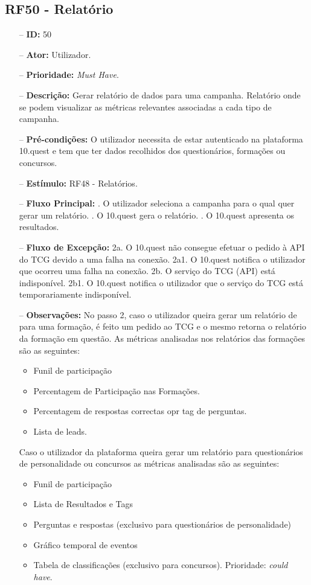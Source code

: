 \subsection{RF50 - Relatório}
\begin{itemize}
	\item[--] \textbf{ID:} 50
	\item[--]  \textbf{Ator:} Utilizador.
	\item[--]  \textbf{Prioridade:} \textit{Must Have}.
	\item[--]  \textbf{Descrição:} Gerar relatório de dados para uma campanha. Relatório onde se podem visualizar as métricas relevantes associadas a cada tipo de campanha.
	\item[--]  \textbf{Pré-condições:} O utilizador necessita de estar autenticado na plataforma 10.quest e tem que ter dados recolhidos dos questionários, formações ou concursos.
	\item[--]  \textbf{Estímulo:} RF48 - Relatórios.
	\item[--]  \textbf{Fluxo Principal:} 
		. O utilizador seleciona a campanha para o qual quer gerar um relatório.
		. O 10.quest gera o relatório.
		. O 10.quest apresenta os resultados.
	\item[--]  \textbf{Fluxo de Excepção:} 
		\subitem 2a. O 10.quest não consegue efetuar o pedido à API do TCG devido a uma falha na conexão.
		\subitem 2a1. O 10.quest notifica o utilizador que ocorreu uma falha na conexão.
		\subitem 2b. O serviço do TCG (API) está indisponível.
		\subitem 2b1. O 10.quest notifica o utilizador que o serviço do TCG está temporariamente indisponível. 
	\item[--]  \textbf{Observações:} No passo 2, caso o utilizador queira gerar um relatório de para uma formação, é feito um pedido ao TCG e o mesmo retorna o relatório da formação em questão.
	As métricas analisadas nos relatórios das formações são as seguintes:
	\begin{itemize}
		\item Funil de participação
		\item Percentagem de Participação nas Formações.
		\item Percentagem de respostas correctas opr tag de perguntas.
		\item Lista de leads.
	\end{itemize}
	Caso o utilizador da plataforma queira gerar um relatório para questionários de personalidade ou concursos as métricas analisadas são as seguintes:
	\begin{itemize}
		\item Funil de participação
		\item Lista de Resultados e Tags
		\item Perguntas e respostas (exclusivo para questionários de personalidade)
		\item Gráfico temporal de eventos
		\item Tabela de classificações (exclusivo para concursos). Prioridade: \textit{could have}.
	\end{itemize}
\end{itemize}
\newpage

